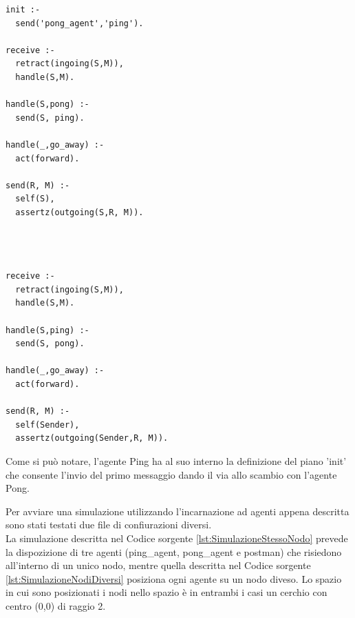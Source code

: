 \documentclass[12pt,a4paper,openright,twoside]{report}
\begin{document}
\bigskip
\medskip
\begin{minipage}{0.45\textwidth}
\begin{lstlisting}[label={lst:PingAgent},caption={Ping agent}]
init :-
  send('pong_agent','ping').

receive :-
  retract(ingoing(S,M)),
  handle(S,M).

handle(S,pong) :-
  send(S, ping).

handle(_,go_away) :-
  act(forward).

send(R, M) :-
  self(S),
  assertz(outgoing(S,R, M)).
\end{lstlisting}
\end{minipage}
\hfill
\begin{minipage}{0.45\textwidth}
\begin{lstlisting}[label={lst:PongAgent},caption={Pong agent}]



receive :-
  retract(ingoing(S,M)),
  handle(S,M).

handle(S,ping) :-
  send(S, pong).

handle(_,go_away) :-
  act(forward).

send(R, M) :-
  self(Sender),
  assertz(outgoing(Sender,R, M)).
\end{lstlisting}
\end{minipage}%

\bigskip

Come si pu\`o notare, l'agente Ping ha al suo interno la definizione del piano 'init' che consente l'invio del primo messaggio dando il via allo scambio con l'agente Pong.

Per avviare una simulazione utilizzando l'incarnazione ad agenti appena descritta sono stati testati due file di confiurazioni diversi.
\\
La simulazione descritta nel Codice sorgente \ref{lst:SimulazioneStessoNodo} prevede la dispozizione di tre agenti (ping\_agent, pong\_agent e postman) che risiedono all'interno di un unico nodo, mentre quella descritta nel Codice sorgente \ref{lst:SimulazioneNodiDiversi} posiziona ogni agente su un nodo diveso. Lo spazio in cui sono posizionati i nodi nello spazio \`e in entrambi i casi un cerchio con centro (0,0) di raggio 2.
\end{document}
